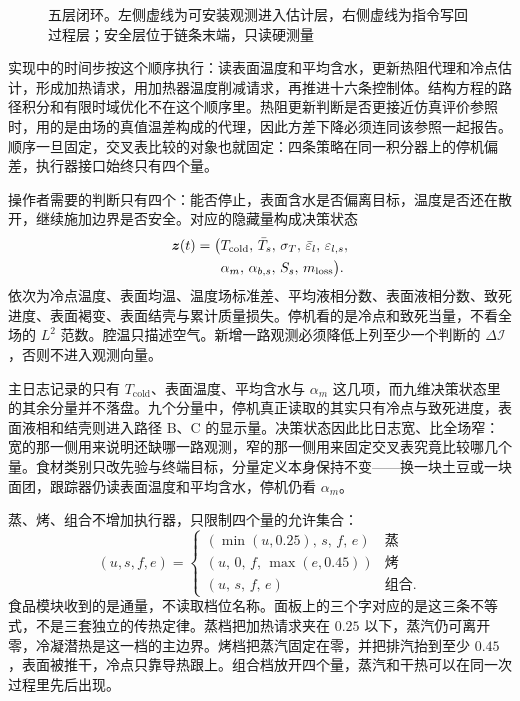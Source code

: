 \begin{figure}[htbp]
\centering
{}
\caption{五层闭环。左侧虚线为可安装观测进入估计层，右侧虚线为指令写回过程层；安全层位于链条末端，只读硬测量}
\label{fig:loop}
\end{figure}

实现中的时间步按这个顺序执行：读表面温度和平均含水，更新热阻代理和冷点估计，形成加热请求，用加热器温度削减请求，再推进十六条控制体。结构方程的路径积分和有限时域优化不在这个顺序里。热阻更新判断是否更接近仿真评价参照时，用的是由场的真值温差构成的代理，因此方差下降必须连同该参照一起报告。顺序一旦固定，交叉表比较的对象也就固定：四条策略在同一积分器上的停机偏差，执行器接口始终只有四个量。

操作者需要的判断只有四个：能否停止，表面含水是否偏离目标，温度是否还在散开，继续施加边界是否安全。对应的隐藏量构成决策状态
\begin{equation}
\label{eq:z}
\begin{aligned}
\bm{z}(t)=\bigl(&
T_{\mathrm{cold}},\,
\bar T_s,\,
\sigma_T,\,
\bar\varepsilon_l,\,
\varepsilon_{l,s},\\
&\alpha_m,\,
\alpha_{b,s},\,
S_s,\,
m_{\mathrm{loss}}
\bigr).
\end{aligned}
\end{equation}
依次为冷点温度、表面均温、温度场标准差、平均液相分数、表面液相分数、致死进度、表面褐变、表面结壳与累计质量损失。停机看的是冷点和致死当量，不看全场的 \(L^2\) 范数。腔温只描述空气。新增一路观测必须降低上列至少一个判断的 \(\Delta\mathcal{I}\)，否则不进入观测向量。

主日志记录的只有 \(T_{\mathrm{cold}}\)、表面温度、平均含水与 \(\alpha_m\) 这几项，而九维决策状态里的其余分量并不落盘。九个分量中，停机真正读取的其实只有冷点与致死进度，表面液相和结壳则进入路径 B、C 的显示量。决策状态因此比日志宽、比全场窄：宽的那一侧用来说明还缺哪一路观测，窄的那一侧用来固定交叉表究竟比较哪几个量。食材类别只改先验与终端目标，分量定义本身保持不变——换一块土豆或一块面团，跟踪器仍读表面温度和平均含水，停机仍看 \(\alpha_m\)。

蒸、烤、组合不增加执行器，只限制四个量的允许集合：
\begin{equation}
\label{eq:mode}
(u,s,f,e)=
\begin{cases}
(\min(u,0.25),\,s,\,f,\,e) & \text{蒸}\\
(u,\,0,\,f,\,\max(e,0.45)) & \text{烤}\\
(u,\,s,\,f,\,e) & \text{组合}.
\end{cases}
\end{equation}
食品模块收到的是通量，不读取档位名称。面板上的三个字对应的是这三条不等式，不是三套独立的传热定律。蒸档把加热请求夹在 \(0.25\) 以下，蒸汽仍可离开零，冷凝潜热是这一档的主边界。烤档把蒸汽固定在零，并把排汽抬到至少 \(0.45\)，表面被推干，冷点只靠导热跟上。组合档放开四个量，蒸汽和干热可以在同一次过程里先后出现。

